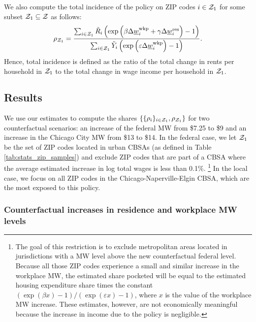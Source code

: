 We also compute the total incidence of the policy on ZIP codes $i\in\mathcal{Z}_1$
for some subset $\mathcal{Z}_1\subseteq\mathcal{Z}$ as follows:
\begin{equation*}\label{eq:tot_incidence}
    \rho_{\mathcal{Z}_1} = 
        \frac{\sum_{i\in\mathcal{Z}_1} \tilde R_i \left(\exp \left( \beta \Delta \underline{w}_i^{\text{wkp}} 
                                    + \gamma \Delta \underline{w}_i^{\text{res}} \right) - 1\right) }
            {\sum_{i\in\mathcal{Z}_1} \tilde Y_i \left( \exp \left( \varepsilon \Delta \underline{w}_i^{\text{wkp}} \right) 
                                    - 1\right) } .
\end{equation*}
Hence, total incidence is defined as the ratio of the total change in rents
per household in $\mathcal{Z}_1$ to the total change in wage income per household 
in $\mathcal{Z}_1$.

\subsection{Results}\label{sec:results_cf}

We use our estimates to compute the shares 
$\{\{\rho_i\}_{i\in\mathcal{Z}_1},\rho_{\mathcal{Z}_1}\}$ for two counterfactual scenarios:
an increase of the federal MW from \$7.25 to \$9 and 
an increase in the Chicago City MW from \$13 to \$14.
In the federal case, we let $\mathcal{Z}_1$ be the set of ZIP codes located in urban 
CBSAs (as defined in Table \ref{tab:stats_zip_samples}) and exclude ZIP codes 
that are part of a CBSA where the average estimated increase in log total wages 
is less than 0.1\%.%
\footnote{\label{foot:restriction_on_zipcodes}
The goal of this restriction is to exclude metropolitan areas located 
in jurisdictions with a MW level above the new counterfactual federal level.
Because all those ZIP codes experience a small and similar increase in the 
workplace MW, the estimated share pocketed will be equal to the estimated
housing expenditure share times the constant 
$\left(\exp(\beta x)-1\right)/\left(\exp(\varepsilon x)-1\right)$,
where $x$ is the value of the workplace MW increase.
These estimates, however, are not economically meaningful because the increase
in income due to the policy is negligible.}
In the local case, we focus on all ZIP codes in the Chicago-Naperville-Elgin CBSA,
which are the most exposed to this policy.

\subsubsection{Counterfactual increases in residence and workplace MW levels}
\label{sec:cf_res_and_wkp_changes}

